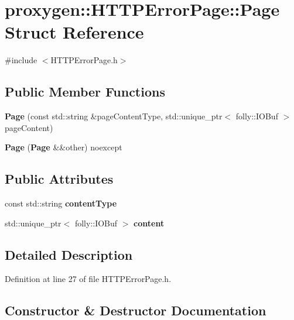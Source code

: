\section{proxygen\+:\+:H\+T\+T\+P\+Error\+Page\+:\+:Page Struct Reference}
\label{structproxygen_1_1HTTPErrorPage_1_1Page}


{\ttfamily \#include $<$H\+T\+T\+P\+Error\+Page.\+h$>$}

\subsection*{Public Member Functions}
\begin{DoxyCompactItemize}
\item 
{\bf Page} (const std\+::string \&page\+Content\+Type, std\+::unique\+\_\+ptr$<$ folly\+::\+I\+O\+Buf $>$ page\+Content)
\item 
{\bf Page} ({\bf Page} \&\&other) noexcept
\end{DoxyCompactItemize}
\subsection*{Public Attributes}
\begin{DoxyCompactItemize}
\item 
const std\+::string {\bf content\+Type}
\item 
std\+::unique\+\_\+ptr$<$ folly\+::\+I\+O\+Buf $>$ {\bf content}
\end{DoxyCompactItemize}


\subsection{Detailed Description}


Definition at line 27 of file H\+T\+T\+P\+Error\+Page.\+h.



\subsection{Constructor \& Destructor Documentation}
